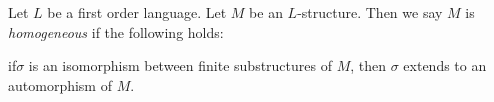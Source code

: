 \documentclass[12pt]{article}
\begin{document}
Let $L$ be a first order language. Let $M$ be an $L$-structure. 
Then we say $M$ is {\em homogeneous} if the following holds:

if$\sigma$ is an isomorphism between finite substructures of $M$, 
then $\sigma$ extends to an automorphism of $M$.
\end{document}
